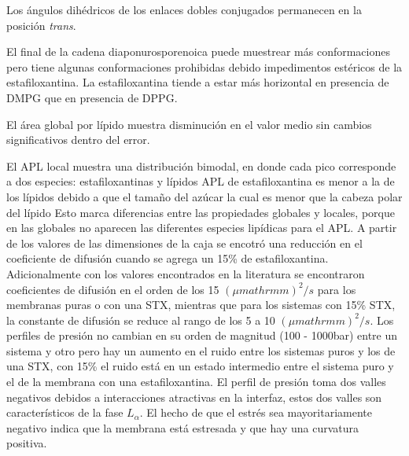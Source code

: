 Los \'{a}ngulos dih\'{e}dricos de los enlaces dobles conjugados permanecen en la posici\'{o}n \textit{trans}.

El final de la cadena diaponurosporenoica puede muestrear m\'{a}s conformaciones pero tiene algunas conformaciones prohibidas debido impedimentos est\'{e}ricos de la estafiloxantina. %
La estafiloxantina tiende a estar m\'{a}s horizontal en presencia de DMPG que en presencia de DPPG.

El \'{a}rea global por l\'{i}pido muestra disminuci\'{o}n en el valor medio sin cambios significativos dentro del error.

El APL local muestra una distribuci\'{o}n bimodal, en donde cada pico corresponde a dos especies: estafiloxantinas y l\'{i}pidos
APL de estafiloxantina es menor a la de los l\'{i}pidos debido a que el tama\~{n}o del az\'{u}car la cual es menor que la cabeza polar del l\'{i}pido
Esto marca diferencias entre las propiedades globales y locales, porque en las globales no aparecen las diferentes especies lip\'{i}dicas para el APL.
A partir de los valores de las dimensiones de la caja se encotr\'{o} una reducci\'{o}n en el coeficiente de difusi\'{o}n cuando se agrega un 15\% de estafiloxantina. Adicionalmente con los valores encontrados en la literatura se encontraron coeficientes de difusi\'{o}n en el orden de los 15 $(\mu mathrm{m})^2/s$ para los membranas puras o con una STX, mientras que para los sistemas con 15\% STX, la constante de difusi\'{o}n se reduce al rango de los  5 a 10 $(\mu mathrm{m})^2/s$.
Los perfiles de presi\'{o}n no cambian en su orden de magnitud (100 - 1000bar) entre un sistema y otro pero hay un aumento en el ruido entre los sistemas puros y los de una STX, con 15\% el ruido est\'{a} en un estado intermedio entre el sistema puro y el de la membrana con una estafiloxantina. 
El perfil de presi\'{o}n toma dos valles negativos debidos a interacciones atractivas en la interfaz, estos dos valles son caracter\'{i}sticos de la fase $L_{\alpha}$.
El hecho de que el estr\'{e}s sea mayoritariamente negativo indica que la membrana est\'{a} estresada y que hay una curvatura positiva.
